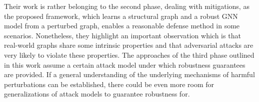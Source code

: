 \documentclass[a4paper,preprint]{sig-alternate}
\begin{document}
Their work is rather belonging to the second phase, dealing with mitigations, as the proposed framework, which learns a structural graph and 
a robust GNN model from a perturbed graph, enables a reasonable defense method in some scenarios.
Nonetheless, they highlight an important observation which is that real-world graphs share some intrinsic properties and that adversarial 
attacks are very likely to violate these properties.
The approaches of the third phase outlined in this work assume a certain attack model under which robustness guarantees are provided.
If a general understanding of the underlying mechanisms of harmful perturbations can be established, there could be even more room
for generalizations of attack models to guarantee robustness for.

\vfill
\pagebreak



\end{document}
